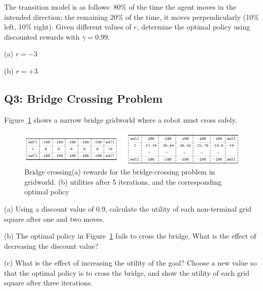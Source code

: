 \documentclass[11pt,a4paper]{scrartcl}
\begin{document}
The transition model is as follows: 80\% of the time the agent moves in the intended direction; the remaining 20\% of the time, it moves perpendicularly (10\% left, 10\% right). Given different values of $r$, determine the optimal policy using discounted rewards with $\gamma = 0.99$.

(a) $r = -3$

(b) $r = +3$

\subsection*{Q3: Bridge Crossing Problem}

Figure~\ref{fig:bridge} shows a narrow bridge gridworld where a robot must cross safely.


\begin{figure}[h]
  \begin{center}
    \includegraphics[width=15cm]{bridge.png}
  \end{center}
    \caption{Bridge crossing(a) rewards for the bridge-crossing problem in gridworld. (b) utilities after 5 iterations,
and the corresponding optimal policy}
    \label{fig:bridge}
\end{figure}

(a) Using a discount value of 0.9, calculate the utility of each non-terminal grid square after one and two moves.

(b) The optimal policy in Figure~\ref{fig:bridge} fails to cross the bridge. What is the effect of decreasing the discount value?

(c) What is the effect of increasing the utility of the goal? Choose a new value so that the optimal policy is to cross the bridge, and show the utility of each grid square after three iterations.
\end{document}
